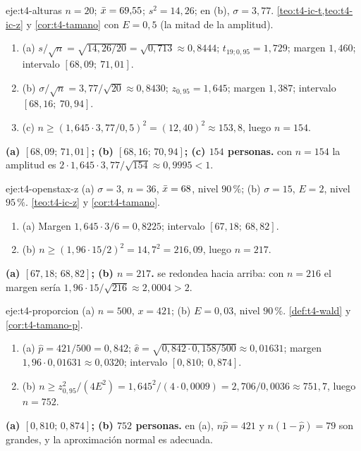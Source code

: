 \begin{solucion}{eje:t4-alturas}
\datos $n=20$; $\bar{x}=69{,}55$; $s^{2}=14{,}26$; en (b), $\sigma=3{,}77$.
\planteamiento \cref{teo:t4-ic-t,teo:t4-ic-z} y \cref{cor:t4-tamano} con $E=0{,}5$ (la mitad de la amplitud).
\pasos
\begin{enumerate}[label=\arabic*.]
  \item (a) $s/\sqrt n=\sqrt{14{,}26/20}=\sqrt{0{,}713}\approx0{,}8444$; $t_{19;0{,}95}=1{,}729$; margen $1{,}460$; intervalo $[68{,}09;\allowbreak\ 71{,}01]$.
  \item (b) $\sigma/\sqrt n=3{,}77/\sqrt{20}\approx0{,}8430$; $z_{0{,}95}=1{,}645$; margen $1{,}387$; intervalo $[68{,}16;\allowbreak\ 70{,}94]$.
  \item (c) $n\ge(1{,}645\cdot3{,}77/0{,}5)^{2}=(12{,}40)^{2}\approx153{,}8$, luego $n=154$.
\end{enumerate}
\resultado \textbf{(a) $[68{,}09;\allowbreak\,71{,}01]$; (b) $[68{,}16;\allowbreak\,70{,}94]$; (c) $154$ personas.}
\comprobacion con $n=154$ la amplitud es $2\cdot1{,}645\cdot3{,}77/\sqrt{154}\approx0{,}9995<1$.
\end{solucion}

\begin{solucion}{eje:t4-openstax-z}
\datos (a) $\sigma=3$, $n=36$, $\bar{x}=68$, nivel $90\,\%$; (b) $\sigma=15$, $E=2$, nivel $95\,\%$.
\planteamiento \cref{teo:t4-ic-z} y \cref{cor:t4-tamano}.
\pasos
\begin{enumerate}[label=\arabic*.]
  \item (a) Margen $1{,}645\cdot3/6=0{,}8225$; intervalo $[67{,}18;\allowbreak\ 68{,}82]$.
  \item (b) $n\ge(1{,}96\cdot15/2)^{2}=14{,}7^{2}=216{,}09$, luego $n=217$.
\end{enumerate}
\resultado \textbf{(a) $[67{,}18;\allowbreak\,68{,}82]$; (b) $n=217$.}
\comprobacion se redondea hacia arriba: con $n=216$ el margen sería $1{,}96\cdot15/\sqrt{216}\approx2{,}0004>2$.
\end{solucion}

\begin{solucion}{eje:t4-proporcion}
\datos (a) $n=500$, $x=421$; (b) $E=0{,}03$, nivel $90\,\%$.
\planteamiento \cref{def:t4-wald} y \cref{cor:t4-tamano-p}.
\pasos
\begin{enumerate}[label=\arabic*.]
  \item (a) $\widehat p=421/500=0{,}842$; $\widehat{\ee}=\sqrt{0{,}842\cdot0{,}158/500}\approx0{,}01631$; margen $1{,}96\cdot0{,}01631\approx0{,}0320$; intervalo $[0{,}810;\allowbreak\ 0{,}874]$.
  \item (b) $n\ge z_{0{,}95}^{2}/(4E^{2})=1{,}645^{2}/(4\cdot0{,}0009)=2{,}706/0{,}0036\approx751{,}7$, luego $n=752$.
\end{enumerate}
\resultado \textbf{(a) $[0{,}810;\allowbreak\,0{,}874]$; (b) $752$ personas.}
\comprobacion en (a), $n\widehat p=421$ y $n(1-\widehat p)=79$ son grandes, y la aproximación normal es adecuada.
\end{solucion}

